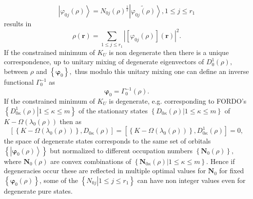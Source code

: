 \documentclass[aps,preprint]{revtex4}%
\begin{document}
\begin{equation}
\left\vert \varphi_{0j}\left(  \rho\right)  \right\rangle =N_{0j}\left(
\rho\right)  ^{\frac{1}{2}}\left\vert \widetilde{\varphi_{0j}\left(
\rho\right)  }\right\rangle ,1\leq j\leq r_{1}%
\end{equation}
results in
\begin{equation}
\rho\left(  \boldsymbol{r}\right)  =\sum_{1\leq j\leq r_{1}}\left\vert \left[
\varphi_{0j}\left(  \rho\right)  \right]  \left(  \boldsymbol{r}\right)
\right\vert ^{2}.\label{gammaKS}%
\end{equation}
If the constrained minimum of $K_{U}$ is non degenerate then there is a unique
correspondence, up to unitary mixing of degenerate eigenvectors of $D_{0}%
^{1}\left(  \rho\right)  ,$ between $\rho$ and $\left\{  \boldsymbol{\varphi
}_{0}\right\}  ,$ thus modulo this unitary mixing one can define an inverse
functional $\Gamma_{0}^{-1}$ as
\begin{equation}
\boldsymbol{\varphi}_{0}=\Gamma_{0}^{-1}\left(  \rho\right)  .
\end{equation}
If the constrained minimum of $K_{U}$ is degenerate, e.g. corresponding to
FORDO's $\left\{  \left.  D_{0\kappa}^{1}\left(  \rho\right)  \right\vert
1\leq\kappa\leq m\right\}  $ of the stationary states $\left\{  \left.
D_{0\kappa}\left(  \rho\right)  \right\vert 1\leq\kappa\leq m\right\}  $ of
$K-\Omega\left(  \lambda_{0}\left(  \rho\right)  \right)  $ then as
\begin{equation}
\left[  \left\{  K-\Omega\left(  \lambda_{0}\left(  \rho\right)  \right)
\right\}  ,D_{0\kappa}\left(  \rho\right)  \right]  =\left[  \left\{
K-\Omega\left(  \lambda_{0}\left(  \rho\right)  \right)  \right\}
,D_{0\kappa}^{1}\left(  \rho\right)  \right]  =0,
\end{equation}
the space of degenerate states corresponds to the same set of orbitals
$\left\{  \left\vert \boldsymbol{\varphi}_{0}\left(  \rho\right)
\right\rangle \right\}  $ but normalized to different occupation numbers
$\left\{  \boldsymbol{N}_{0}\left(  \rho\right)  \right\}  ,$ where
$\boldsymbol{N}_{0}\left(  \rho\right)  $ are convex combinations of $\left\{
\left.  \boldsymbol{N}_{0\kappa}\left(  \rho\right)  \right\vert 1\leq
\kappa\leq m\right\}  $. Hence if degeneracies occur these are reflected in
multiple optimal values for $\boldsymbol{\boldsymbol{N}}_{0}$ for fixed
$\left\{  \boldsymbol{\varphi}_{0}\left(  \rho\right)  \right\}  $, some of
the $\left\{  \left.  N_{0j}\right\vert 1\leq j\leq r_{1}\right\}  $ can have
non integer values even for degenerate pure states$\boldsymbol{.}$
\end{document}
